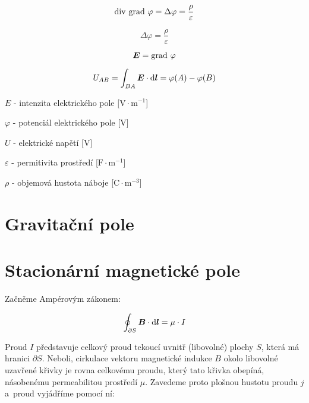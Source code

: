 \begin{equation}
\mathrm{div} \ \mathrm{grad} \ \varphi = \Delta \varphi = \frac{\rho}{\varepsilon}
\end{equation}

\begin{fact}
\begin{equation}
\Delta \varphi = \frac{\rho}{\varepsilon}
\end{equation}

\begin{equation}
\boldsymbol{E} = \mathrm{grad} \ \varphi
\end{equation}

\begin{equation}
U_{AB} = \int_{BA} \boldsymbol{E} \cdot \mathrm{d}\boldsymbol{l} = \varphi(A) - \varphi(B) 
\end{equation}

\(E\) - intenzita elektrického pole [\(\mathrm{V} \cdot \mathrm{m}^{-1}\)]

\(\varphi\) - potenciál elektrického pole [\(\mathrm{V}\)]

\(U\) - elektrické napětí [\(\mathrm{V}\)]

\(\varepsilon\) - permitivita prostředí [\(\mathrm{F} \cdot \mathrm{m}^{-1}\)]

\(\rho\) - objemová hustota náboje [\(\mathrm{C} \cdot \mathrm{m}^{-3}\)] 
\end{fact}

\section{Gravitační pole}

\section{Stacionární magnetické pole}

Začněme Ampérovým zákonem:

\begin{equation}
\oint_{\partial S} \boldsymbol{B} \cdot \mathrm{d}\boldsymbol{l} = \mu \cdot I
\end{equation}

Proud \(I\) představuje celkový proud tekoucí uvnitř (libovolné) plochy \(S\), která má hranici \(\partial S\). Neboli, cirkulace vektoru magnetické indukce \(B\) okolo libovolné uzavřené křivky je rovna celkovému proudu, který tato křivka obepíná, násobenému permeabilitou prostředí \(\mu\). Zavedeme proto plošnou hustotu proudu \(j\) a~proud vyjádříme pomocí ní:

